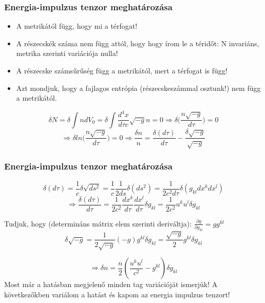 \documentclass{beamer}
\begin{document}
\begin{frame}
\frametitle{Energia-impulzus tenzor meghatározása}
\begin{itemize}
\item A metrikától függ, hogy mi a térfogat!
\item A részecskék száma nem függ attól, hogy hogy írom le a téridőt: N invariáns, metrika szerinti variációja nulla!
\item A részecske számsűrűség függ a metrikától, mert a térfogat is függ!
\item Azt mondjuk, hogy a fajlagos entrópia (részecskeszámmal osztunk!) nem függ a metrikától.
\end{itemize}
\begin{equation*}
\delta N = \delta \int n dV_0= \delta \int \frac{d^4x}{d\tau c}\sqrt{-g}n=0\Rightarrow \delta\bigg(\frac{n\sqrt{-g}}{d\tau}\bigg)=0
\end{equation*}
\begin{equation*}
\Rightarrow  \delta ln\bigg(\frac{n\sqrt{-g}}{d\tau}\bigg)=0 \Rightarrow \frac{\delta n}{n}=\frac{\delta(d\tau)}{d\tau}-\frac{\delta\sqrt{-g}}{\sqrt{-g}}
\end{equation*}
\end{frame}

\begin{frame}
\frametitle{Energia-impulzus tenzor meghatározása}
\begin{equation*}
\delta(d\tau)=\frac{1}{c}\delta\sqrt{ds^2}=\frac{1}{c}\frac{1}{2ds}\delta(ds^2)=\frac{1}{2c^2 d\tau}\delta(g_{kl}dx^kdx^l)
\end{equation*}
\begin{equation*}
\Rightarrow \frac{\delta(d\tau)}{d\tau}=\frac{1}{2c^2}\frac{dx^k}{d\tau}\frac{dx^l}{d\tau}\delta g_{kl}=\frac{1}{2c^2}u^ku^l\delta g_{kl}
\end{equation*}

Tudjuk, hogy (determináns mátrix elem szerinti deriváltja): $\frac{\partial g}{\partial g_{kl}}=g g^{kl}$
\begin{equation*}
\delta \sqrt{-g}=\frac{1}{2\sqrt{-g}}(-g)g^{kl}\delta g_{kl}=\frac{\sqrt{-g}}{2}g^{kl}\delta g_{kl}
\end{equation*}

\begin{equation*}
\Rightarrow \delta n=\frac{n}{2}(\frac{u^ku^l}{c^2}-g^{kl})\delta g_{kl}
\end{equation*}
Most már a hatásban megjelenő minden tag variációját ismerjük! A következőkben variálom a hatást és kapom az energia impulzus tenzort!
\end{frame}
\end{document}
